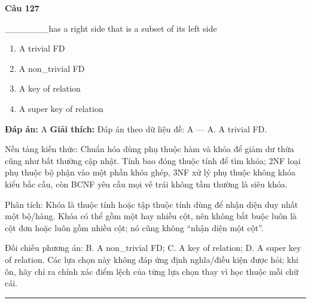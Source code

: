 \documentclass[11pt,a4paper]{article}
\newenvironment{question}[1]{%
  \par\vspace{1em}\noindent\textbf{\large Câu #1}\par\vspace{0.4em}
}{%
  \par\vspace{1em}\hrule\vspace{0.6em}
}
\newenvironment{choices}{%
  \begin{enumerate}[label=\textbf{\Alph*.},leftmargin=2.2em,itemsep=2pt,topsep=3pt]
}{%
  \end{enumerate}
}
\newcommand{\choice}{\item}
\begin{document}
\begin{question}{127}
_______has a right side that is a subset of its left side
\begin{choices}
\choice A trivial FD
\choice A non_trivial FD
\choice A key of relation
\choice A super key of relation
\end{choices}
\textbf{Đáp án:} A
\textbf{Giải thích:} Đáp án theo dữ liệu đề: A — A. A trivial FD.

Nền tảng kiến thức: Chuẩn hóa dùng phụ thuộc hàm và khóa để giảm dư thừa cũng như bất thường cập nhật. Tính bao đóng thuộc tính để tìm khóa; 2NF loại phụ thuộc bộ phận vào một phần khóa ghép, 3NF xử lý phụ thuộc không khóa kiểu bắc cầu, còn BCNF yêu cầu mọi vế trái không tầm thường là siêu khóa.

Phân tích: Khóa là thuộc tính hoặc tập thuộc tính dùng để nhận diện duy nhất một bộ/hàng. Khóa có thể gồm một hay nhiều cột, nên không bắt buộc luôn là cột đơn hoặc luôn gồm nhiều cột; nó cũng không “nhận diện một cột”.

Đối chiếu phương án: B. A non_trivial FD; C. A key of relation; D. A super key of relation. Các lựa chọn này không đáp ứng định nghĩa/điều kiện được hỏi; khi ôn, hãy chỉ ra chính xác điểm lệch của từng lựa chọn thay vì học thuộc mỗi chữ cái.
\end{question}
\end{document}
